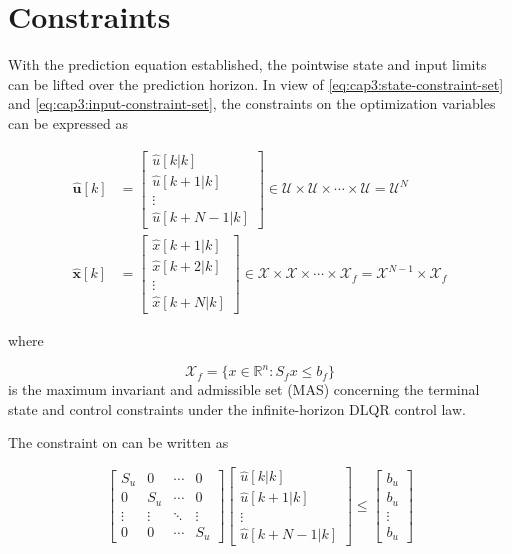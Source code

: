 
\section{Constraints}

With the prediction equation established, the pointwise state and input limits can be lifted over the prediction horizon. In view of \eqref{eq:cap3:state-constraint-set} and \eqref{eq:cap3:input-constraint-set}, the constraints on the optimization 
variables can be expressed as

\noindent
\begin{align}
	\mathbf{\hat{u}}[k]&= \left[
		\begin{matrix}
			\hat{u}[k | k] \\
			\hat{u}[k + 1 | k] \\
			\vdots \\
			\hat{u}[k + N-1 | k]
		\end{matrix}
	\right]
	\in \mathcal{U} \times  \mathcal{U} \times \cdots \times \mathcal{U} = \mathcal{U}^N \\
		\mathbf{\hat{x}}[k] &= \left[
		\begin{matrix}
			\hat{x}[k + 1 | k] \\
			\hat{x}[k + 2 | k] \\
			\vdots \\
			\hat{x}[k + N | k]
		\end{matrix}
	\right]
	\in \mathcal{X} \times  \mathcal{X} \times \cdots \times \mathcal{X}_f = \mathcal{X}^{N-1} \times \mathcal{X}_f
\end{align}

\noindent
where

\noindent
\begin{equation}
	\mathcal{X}_f = \big\{x \in \mathbb{R}^n : S_f x \le b_f \big\}
\end{equation}
is the maximum invariant and admissible set (MAS) concerning the terminal state and control
constraints under the infinite-horizon DLQR control law.

The constraint on  can be  written as

\noindent
\begin{equation}
	\left[
		\begin{matrix}
			S_u & 0 & \cdots & 0 \\
			0 & S_u & \cdots & 0 \\
			\vdots & \vdots & \ddots & \vdots \\
			0 & 0 & \cdots & S_u
		\end{matrix}
	\right]
	\left[
		\begin{matrix}
			\hat{u}[k | k] \\
			\hat{u}[k + 1 | k] \\
			\vdots \\
			\hat{u}[k + N-1 | k]
		\end{matrix}
	\right]
	\leq
	\left[
		\begin{matrix}
			b_u \\
			b_u \\
			\vdots \\
			b_u
		\end{matrix}
	\right]
\end{equation}


